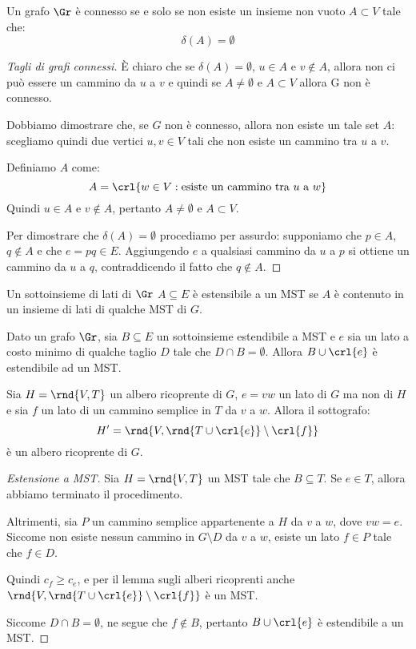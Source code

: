 \documentclass[\main/main.tex]{subfiles}
\begin{document}
\begin{theorem}
  Un grafo \(\Gr \) è connesso se e solo se non esiste un insieme non vuoto \(A \subset V\) tale che:
  \[
    \delta(A) = \emptyset
  \]
\end{theorem}
\begin{proof}[Tagli di grafi connessi]
  È chiaro che se \(\delta(A) = \emptyset \), \(u \in A\) e \(v \not\in A\), allora non ci può essere un cammino da \(u\) a \(v\) e quindi se \(A \neq \emptyset \) e \(A \subset V\) allora G non è connesso.

  Dobbiamo dimostrare che, se \(G\) non è connesso, allora non esiste un tale set \(A\): scegliamo quindi due vertici \(u, v \in V\) tali che non esiste un cammino tra \(u\) a \(v\).

  Definiamo \(A\) come:
  \[
    A = \crl{w \in V: \text{esiste un cammino tra \(u\) a \(w\)}}
  \]
  Quindi \(u \in A\) e \(v \not\in A\), pertanto \(A \neq \emptyset \) e \(A \subset V\).

  Per dimostrare che \(\delta(A) = \emptyset \) procediamo per assurdo: supponiamo che \(p \in A\), \(q \not\in A\) e che \(e = pq \in E\). Aggiungendo \(e\) a qualsiasi cammino da \(u\) a \(p\) si ottiene un cammino da \(u\) a \(q\), contraddicendo il fatto che \(q \not\in A\).
\end{proof}
\begin{definition}
  Un sottoinsieme di lati di \(\Gr \) \(A \subseteq E\) è estensibile a un MST se \(A\) è contenuto in un insieme di lati di qualche MST di \(G\).
\end{definition}
\begin{theorem}
  Dato un grafo \(\Gr \), sia \(B \subseteq E\) un sottoinsieme estendibile a MST e \(e\) sia un lato a costo minimo di qualche taglio \(D\) tale che \(D \cap B = \emptyset \). Allora \(B \cup \crl{e}\) è estendibile ad un MST.
\end{theorem}
\begin{lemma}
  Sia \(H = \rnd{V, T}\) un albero ricoprente di \(G\), \(e = vw\) un lato di \(G\) ma non di \(H\) e sia \(f\) un lato di un cammino semplice in \(T\) da \(v\) a \(w\). Allora il sottografo:
  \[
    H' = \rnd{V, \rnd{T \cup \crl{e}}\setminus \crl{f}}
  \]
  è un albero ricoprente di \(G\).
\end{lemma}
\begin{proof}[Estensione a MST]
  Sia \(H = \rnd{V, T}\) un MST tale che \(B \subseteq T\). Se \(e \in T\), allora abbiamo terminato il procedimento.

  Altrimenti, sia \(P\) un cammino semplice appartenente a \(H\) da \(v\) a \(w\), dove \(vw = e\). Siccome non esiste nessun cammino in \(G\setminus D\) da \(v\) a \(w\), esiste un lato \(f \in P\) tale che \(f \in D\).

  Quindi \(c_f \geq c_e\), e per il lemma sugli alberi ricoprenti anche \(\rnd{V, \rnd{T \cup \crl{e}} \setminus \crl{f}}\) è un MST.

  Siccome \(D \cap B = \emptyset \), ne segue che \(f \not\in B\), pertanto \(B \cup \crl{e}\) è estendibile a un MST.
\end{proof}
\clearpage
\end{document}
